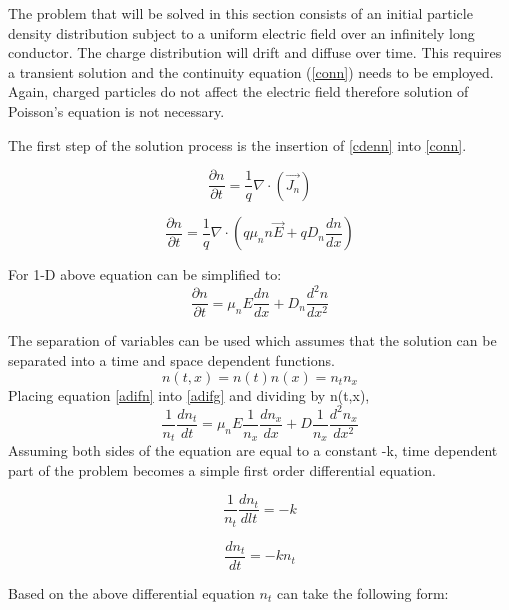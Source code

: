 The problem that will be solved in this section consists of an initial particle density distribution subject to a uniform electric field over an infinitely long conductor. The charge distribution will drift and diffuse over time. This requires a transient solution and the continuity equation (\ref{conn}) needs to be employed. Again, charged particles do not affect the electric field therefore solution of Poisson's equation is not necessary. 

The first step of the solution process is the insertion of \eqref{cdenn} into \eqref{conn}.

\begin{equation}
\frac{\partial n}{\partial t} = \frac{1}{q}\nabla \cdot (\vec{J_n})
\end{equation}


\begin{equation}
\frac{\partial n}{\partial t} = \frac{1}{q}\nabla \cdot (q \mu_{n} n \vec{E}+qD_{n} \frac{dn}{dx} )
\end{equation}

For 1-D above equation can be simplified to:
\begin{equation}
\frac{\partial n}{\partial t} = \mu_n E \frac{d n}{d x}+D_{n}\frac{d^{2}n}{dx^{2}}
\label{adifg}
\end{equation}

The separation of variables can be used which assumes that the solution can be separated into a time and space dependent functions.
\begin{equation}
n(t,x)=n(t)n(x)=n_t n_x
\label{adifn}
\end{equation}
Placing equation \eqref{adifn} into \eqref{adifg} and dividing by n(t,x),
\begin{equation}
\frac{1}{n_{t}}\frac{d n_{t}}{d t}=\mu_n E \frac{1}{n_{x}}\frac{d n_{x}}{dx}+D\frac{1}{n_{x}}\frac{d^2 n_{x}}{dx^2}
\label{Adif}
\end{equation}
Assuming both sides of the equation are equal to a constant -k, time dependent part of the problem becomes a simple first order differential equation.

\begin{equation}
\nonumber
\frac{1}{n_{t}}\frac{d n_{t}}{dl t}=-k
\end{equation}

\begin{equation}
\nonumber
\frac{d n_{t}}{d t}=-kn_t
\end{equation}

Based on the above differential equation $n_t$ can take the following form:

